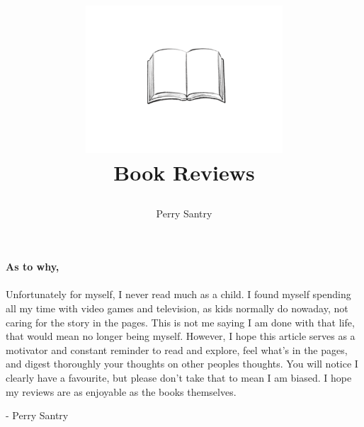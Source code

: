 \documentclass[12pt]{article}
\title{
    \includegraphics[width=0.55\textwidth]{bookimage.png} \\ 
    \textbf{\Huge Book Reviews} \\
    \large
    \date{}
}
\author{Perry Santry}
\begin{document}
\vfill
\maketitle
\vfill
\thispagestyle{empty}
\newpage

\section*{}
\vfill
\Large{\textbf{As to why,}}
\\ \\
Unfortunately for myself, I never read much as a child. I found myself spending all my 
time with video games and television, as kids normally do nowaday, not caring for the 
story in the pages. This is not me saying I am done with that life, that would mean no 
longer being myself. However, I hope this article serves as a motivator and constant 
reminder to read and explore, feel what's in the pages, and digest thoroughly your 
thoughts on other peoples thoughts. You will notice I clearly have a favourite, but 
please don't take that to mean I am biased. I hope my reviews are as enjoyable as the 
books themselves.
\begin{flushright}
    - Perry Santry
\end{flushright}
\vfill

\thispagestyle{empty}
\normalsize
\newpage
\tableofcontents
\setcounter{page}{1}  
\newpage
\end{document}
